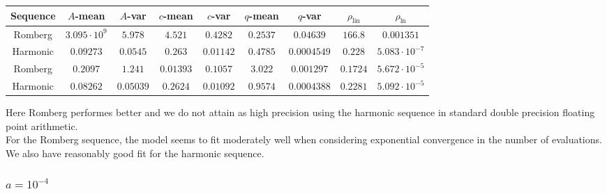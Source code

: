 \begin{table}[H]
    \centering
    \small
    \begin{tabular}{c||c|c|c|c|c|c|c|c}
Sequence & \(A\)-mean & \(A\)-var & \(c\)-mean & \(c\)-var & \(q\)-mean & \(q\)-var & \(\rho_{\operatorname{lin}}\) & \(\rho_{\ln}\)\\\hline
\rowcolor{red}
Romberg & \(3.095\cdot 10^9\) & \(5.978\) & \(4.521\) & \(0.4282\) & \(0.2537\) & \(0.04639\) & \(166.8\) & \(0.001351\) \\
\rowcolor{green}
Harmonic & \(0.09273\) & \(0.0545\) & \(0.263\) & \(0.01142\) & \(0.4785\) & \(0.0004549\) & \(0.228\) & \(5.083\cdot 10^{-7}\) \\
\rowcolor{green}
Romberg & \(0.2097\) & \(1.241\) & \(0.01393\) & \(0.1057\) & \(3.022\) & \(0.001297\) & \(0.1724\) & \(5.672\cdot 10^{-5}\) \\
\rowcolor{green}
Harmonic & \(0.08262\) & \(0.05039\) & \(0.2624\) & \(0.01092\) & \(0.9574\) & \(0.0004388\) & \(0.2281\) & \(5.092\cdot 10^{-5}\) \\
    \end{tabular}
    \label{tab:my_label}
\end{table}

Here Romberg performes better and we do not attain as high precision using the harmonic sequence in standard double precision floating point arithmetic.\\

For the Romberg sequence, the model seems to fit moderately well when considering exponential convergence in the number of evaluations. We also have reasonably good fit for the harmonic sequence.\\

\subsubsection{\(a = 10^{-4}\)}

